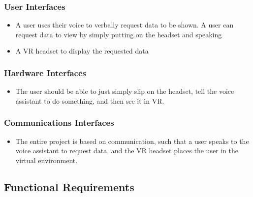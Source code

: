 \documentclass[onecolumn, draftclsnofoot,10pt, compsoc]{IEEEtran}
\begin{document}
        \subsubsection{User Interfaces}
            \begin{itemize}
                \item A user uses their voice to verbally request data to be shown. A user can request data to view by simply putting on the headset and speaking
                \item A VR headset to display the requested data
            \end{itemize}

            \subsubsection{Hardware Interfaces}
            \begin{itemize}
                \item The user should be able to just simply slip on the headset, tell the voice assistant to do something, and then see it in VR.
            \end{itemize}

            \subsubsection{Communications Interfaces}
            \begin{itemize}
                \item The entire project is based on communication, such that a user speaks to the voice assistant to request data, and the VR headset places the user in the virtual environment.
            \end{itemize}

    \subsection{Functional Requirements}
\end{document}
